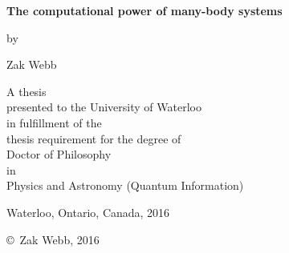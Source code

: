 

\pagestyle{empty}

\begin{titlepage}
        \begin{center}
        \vspace*{1.0cm}

        \Huge
        {\bf The computational power of many-body systems}

        \vspace*{1.0cm}

        \normalsize
        by \\

        \vspace*{1.0cm}

        \Large
        Zak Webb \\

        \vspace*{3.0cm}

        \normalsize
        A thesis \\
        presented to the University of Waterloo \\ 
        in fulfillment of the \\
        thesis requirement for the degree of \\
        Doctor of Philosophy \\
        in \\
        Physics and Astronomy (Quantum Information) \\

        \vspace*{2.0cm}

        Waterloo, Ontario, Canada, 2016 \\

        \vspace*{1.0cm}

        \copyright\ Zak Webb, 2016 \\
        \end{center}
\end{titlepage}

